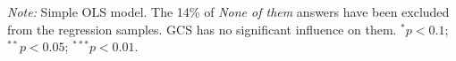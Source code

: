 \begin{bibunit}
\begin{table}[h]
  \caption[Influence of the GCS on electoral prospects]{Preference for a progressive platform depending on whether it includes the GCS or not. (Question \ref{q:conjoint_c}) 
} %
  \makebox[\textwidth][c]{}\label{tab:conjoint_c}
  {\footnotesize \textit{Note:} Simple OLS model. %
  The 14\% of \textit{None of them} answers have been excluded from the regression samples. GCS has no significant influence on them. $^{*}p<0.1$; $^{**} p<0.05$; $^{***} p<0.01$. 
  }
\end{table}

\renewcommand{\url}[1]{\href{#1}{Link}} %
% 

\clearpage

\putbib
\end{bibunit}

